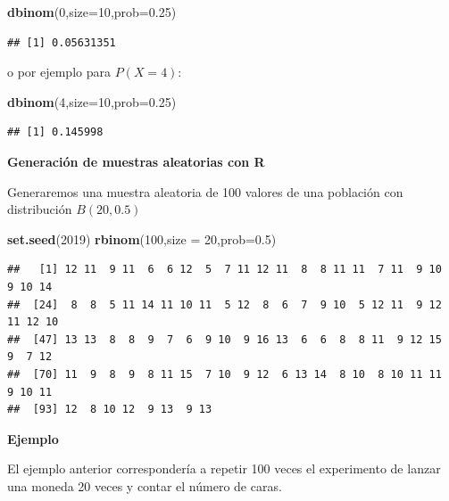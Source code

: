 \documentclass[]{book}
\newenvironment{Shaded}{\begin{snugshade}}{\end{snugshade}}
\newcommand{\DataTypeTok}[1]{\textcolor[rgb]{0.13,0.29,0.53}{#1}}
\newcommand{\DecValTok}[1]{\textcolor[rgb]{0.00,0.00,0.81}{#1}}
\newcommand{\FloatTok}[1]{\textcolor[rgb]{0.00,0.00,0.81}{#1}}
\newcommand{\KeywordTok}[1]{\textcolor[rgb]{0.13,0.29,0.53}{\textbf{#1}}}
\newcommand{\NormalTok}[1]{#1}
\begin{document}
\begin{Shaded}
\begin{Highlighting}[]
\KeywordTok{dbinom}\NormalTok{(}\DecValTok{0}\NormalTok{,}\DataTypeTok{size=}\DecValTok{10}\NormalTok{,}\DataTypeTok{prob=}\FloatTok{0.25}\NormalTok{)}
\end{Highlighting}
\end{Shaded}

\begin{verbatim}
## [1] 0.05631351
\end{verbatim}

o por ejemplo para \(P(X=4)\):

\begin{Shaded}
\begin{Highlighting}[]
\KeywordTok{dbinom}\NormalTok{(}\DecValTok{4}\NormalTok{,}\DataTypeTok{size=}\DecValTok{10}\NormalTok{,}\DataTypeTok{prob=}\FloatTok{0.25}\NormalTok{)}
\end{Highlighting}
\end{Shaded}

\begin{verbatim}
## [1] 0.145998
\end{verbatim}

\textbf{Generación de muestras aleatorias con R}

Generaremos una muestra aleatoria de 100 valores de una población con distribución \(B(20,0.5)\)

\begin{Shaded}
\begin{Highlighting}[]
\KeywordTok{set.seed}\NormalTok{(}\DecValTok{2019}\NormalTok{)}
\KeywordTok{rbinom}\NormalTok{(}\DecValTok{100}\NormalTok{,}\DataTypeTok{size =} \DecValTok{20}\NormalTok{,}\DataTypeTok{prob=}\FloatTok{0.5}\NormalTok{)}
\end{Highlighting}
\end{Shaded}

\begin{verbatim}
##   [1] 12 11  9 11  6  6 12  5  7 11 12 11  8  8 11 11  7 11  9 10  9 10 14
##  [24]  8  8  5 11 14 11 10 11  5 12  8  6  7  9 10  5 12 11  9 12 11 12 10
##  [47] 13 13  8  8  9  7  6  9 10  9 16 13  6  6  8  8 11  9 12 15  9  7 12
##  [70] 11  9  8  9  8 11 15  7 10  9 12  6 13 14  8 10  8 10 11 11  9 10 11
##  [93] 12  8 10 12  9 13  9 13
\end{verbatim}

\textbf{Ejemplo}

El ejemplo anterior correspondería a repetir 100 veces el experimento de lanzar una moneda 20 veces y contar el número de caras.
\end{document}

